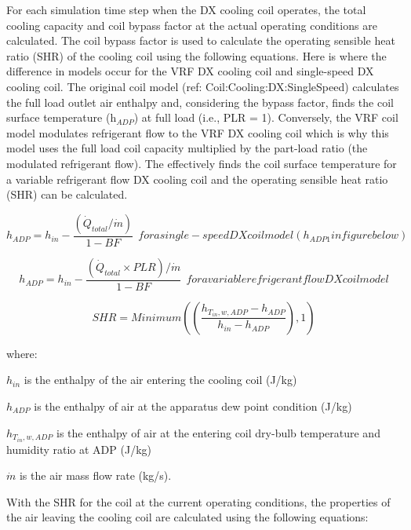 For each simulation time step when the DX cooling coil operates, the total cooling capacity and coil bypass factor at the actual operating conditions are calculated. The coil bypass factor is used to calculate the operating sensible heat ratio (SHR) of the cooling coil using the following equations. Here is where the difference in models occur for the VRF DX cooling coil and single-speed DX cooling coil. The original coil model (ref: Coil:Cooling:DX:SingleSpeed) calculates the full load outlet air enthalpy and, considering the bypass factor, finds the coil surface temperature (h\(_{ADP}\)) at full load (i.e., PLR = 1). Conversely, the VRF coil model modulates refrigerant flow to the VRF DX cooling coil which is why this model uses the full load coil capacity multiplied by the part-load ratio (the modulated refrigerant flow). The effectively finds the coil surface temperature for a variable refrigerant flow DX cooling coil and the operating sensible heat ratio (SHR) can be calculated.

\begin{equation}
{h_{ADP}} = {h_{in}} - \frac{{\left( {{\dot{Q}_{total}}/ \dot{m}} \right)}}{{1 - BF}} ~~for a single-speed DX coil model (h_{ADP1} in figure below)
\end{equation}

\begin{equation}
{h_{ADP}} = {h_{in}} - \frac{{\left( {{\dot{Q}_{total}} \times PLR} \right) / \dot{m}}}{{1 - BF}} ~~for a variable refrigerant flow DX coil model
\end{equation}

\begin{equation}
SHR = Minimum\left( {\left( {\frac{{{h_{T_{in},w,ADP}} - {h_{ADP}}}}{{{h_{in}} - {h_{ADP}}}}} \right),1} \right)
\end{equation}

where:

\({{h_{in}}}\) is the enthalpy of the air entering the cooling coil (J/kg)

\({{h_{ADP}}}\) is the enthalpy of air at the apparatus dew point condition (J/kg)

\({{h_{T_{in},w,ADP}}}\) is the enthalpy of air at the entering coil dry-bulb temperature and humidity ratio at ADP (J/kg)

\(\dot m\) is the air mass flow rate (kg/s).

With the SHR for the coil at the current operating conditions, the properties of the air leaving the cooling coil are calculated using the following equations:

